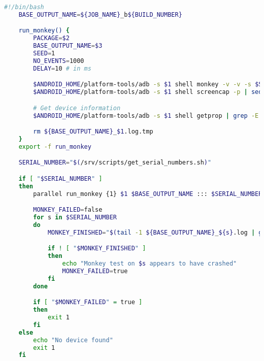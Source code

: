 \begin{description}
    \begin{lstlisting}[language=bash,caption=Script that runs monkey tests on all connected devices in parallel,label=lst:run_monkey_parallel]
    #!/bin/bash
    BASE_OUTPUT_NAME=${JOB_NAME}_b${BUILD_NUMBER}

    run_monkey() {
        PACKAGE=$2
        BASE_OUTPUT_NAME=$3
        SEED=1
        NO_EVENTS=1000
        DELAY=10 # in ms

        $ANDROID_HOME/platform-tools/adb -s $1 shell monkey -v -v -s $SEED --throttle $DELAY -p $PACKAGE $NO_EVENTS > ${BASE_OUTPUT_NAME}_$1.log.tmp
        $ANDROID_HOME/platform-tools/adb -s $1 shell screencap -p | sed 's/\r$//' > ${BASE_OUTPUT_NAME}_$1.png

        # Get device information
        $ANDROID_HOME/platform-tools/adb -s $1 shell getprop | grep -E "product|sdk|serial" | grep -v ro.boot | cat - ${BASE_OUTPUT_NAME}_$1.log.tmp > ${BASE_OUTPUT_NAME}_$1.log

        rm ${BASE_OUTPUT_NAME}_$1.log.tmp
    }
    export -f run_monkey

    SERIAL_NUMBER="$(/srv/scripts/get_serial_numbers.sh)"

    if [ "$SERIAL_NUMBER" ]
    then
        parallel run_monkey {1} $1 $BASE_OUTPUT_NAME ::: $SERIAL_NUMBER

        MONKEY_FAILED=false
        for s in $SERIAL_NUMBER
        do
            MONKEY_FINISHED="$(tail -1 ${BASE_OUTPUT_NAME}_${s}.log | grep -i "monkey finished")"

            if ! [ "$MONKEY_FINISHED" ]
            then
                echo "Monkey test on $s appears to have crashed"
                MONKEY_FAILED=true
            fi
        done

        if [ "$MONKEY_FAILED" = true ]
        then
            exit 1
        fi
    else
        echo "No device found"
        exit 1
    fi
    \end{lstlisting}
\end{description}